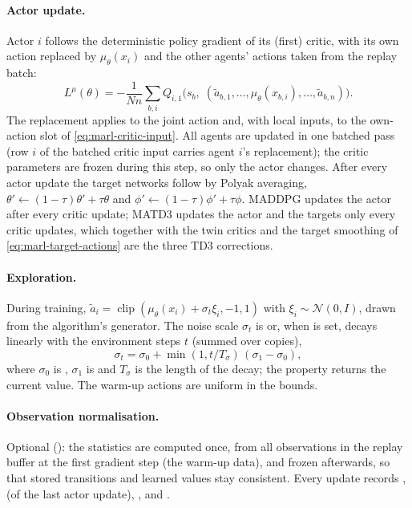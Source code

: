 \paragraph{Actor update.} Actor $i$ follows the deterministic policy gradient
of its (first) critic, with its own action replaced by $\mu_\theta(x_i)$ and
the other agents' actions taken from the replay batch:
\begin{equation}
  L^{\mu}(\theta) = -\frac{1}{N n} \sum_{b, i}
      Q_{i,1}\bigl(s_b,\; (\tilde a_{b,1}, \dots, \mu_\theta(x_{b,i}), \dots,
      \tilde a_{b,n})\bigr).
  \label{eq:marl-ddpg-actor}
\end{equation}
The replacement applies to the joint action and, with local inputs, to the
own-action slot of \eqref{eq:marl-critic-input}. All agents are updated in one
batched pass (row $i$ of the batched critic input carries agent $i$'s
replacement); the critic parameters are frozen during this step, so only the
actor changes. After every actor update the target networks follow by Polyak
averaging, $\theta' \leftarrow (1 - \tau)\theta' + \tau\theta$ and
$\phi' \leftarrow (1 - \tau)\phi' + \tau\phi$. MADDPG updates the actor after
every critic update; MATD3 updates the actor and the targets only every
 critic updates, which together with the twin critics and
the target smoothing of \eqref{eq:marl-target-actions} are the three TD3
corrections.

\paragraph{Exploration.} During training, $\tilde a_i =
\operatorname{clip}(\mu_\theta(x_i) + \sigma_t \xi_i, -1, 1)$ with $\xi_i \sim
\mathcal{N}(0, I)$, drawn from the algorithm's generator. The noise scale
$\sigma_t$ is  or, when
 is set, decays linearly with the environment
steps $t$ (summed over copies),
\begin{equation}
  \sigma_t = \sigma_0 + \min(1, t / T_\sigma)\,(\sigma_1 - \sigma_0),
\end{equation}
where $\sigma_0$ is , $\sigma_1$ is
 and $T_\sigma$ is the length
 of the decay; the property
 returns the current value. The
warm-up actions are uniform in the bounds.

\paragraph{Observation normalisation.} Optional
(): the statistics are computed once, from all
observations in the replay buffer at the first gradient step (the warm-up
data), and frozen afterwards, so that stored transitions and learned values
stay consistent. Every update records , 
(of the last actor update), ,  and
.

